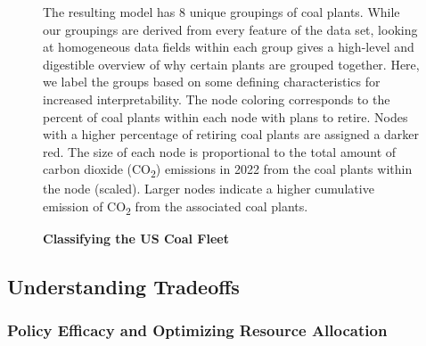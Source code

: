 \begin{figure}[H]
    
    \caption{\textbf{Classifying the US Coal Fleet}}
    \medskip
    \footnotesize
    The resulting model has 8 unique groupings of coal plants. While our groupings are derived from every feature of the data set, looking at homogeneous data fields within each group gives a high-level and digestible overview of why certain plants are grouped together. Here, we label the groups based on some defining characteristics for increased interpretability.
    The node coloring corresponds to the percent of coal plants within each node with plans to retire. Nodes with a higher percentage of retiring coal plants are assigned a darker red. The size of each node is proportional to the total amount of carbon dioxide (CO\textsubscript{2}) emissions in 2022 from the coal plants within the node (scaled). 
    Larger nodes indicate a higher cumulative emission of CO\textsubscript{2} from the associated coal plants.
    \label{fig:coal-fleet-partition}
\end{figure}



\subsection{Understanding Tradeoffs}

\subsubsection{Policy Efficacy and Optimizing Resource Allocation}



